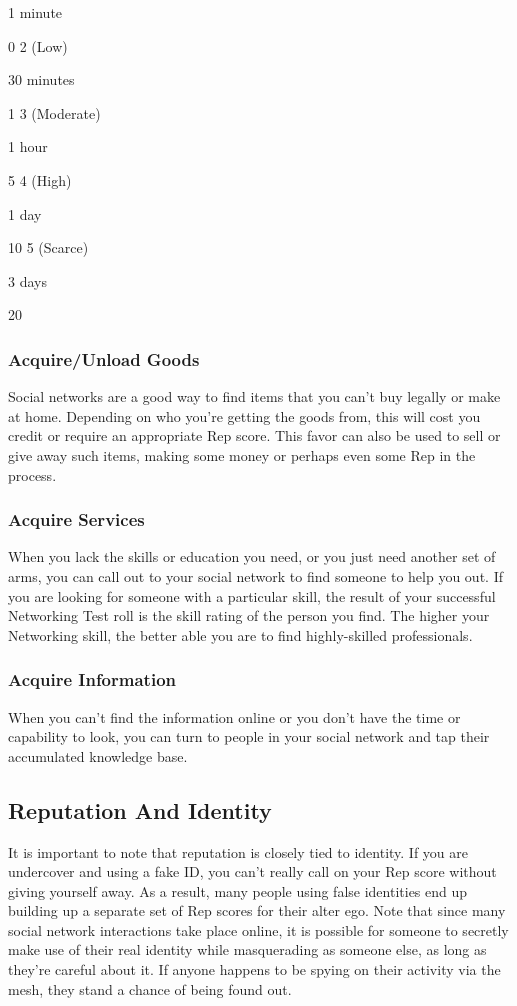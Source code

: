 1 minute

0
2 (Low)

30 minutes

1
3 (Moderate)

1 hour

5
4 (High)

1 day

10
5 (Scarce)

3 days

20

\subsubsection{Acquire/Unload Goods}

Social networks are a good way to find items that 
you can't buy legally or make at home. Depending 
on who you're getting the goods from, this will cost 
you credit or require an appropriate Rep score. This 
favor can also be used to sell or give away such items, 
making some money or perhaps even some Rep in 
the process.

\subsubsection{Acquire Services}

When you lack the skills or education you need, or 
you just need another set of arms, you can call out 
to your social network to find someone to help you 
out. If you are looking for someone with a particular 
skill, the result of your successful Networking Test roll 
is the skill rating of the person you find. The higher 
your Networking skill, the better able you are to find 
highly-skilled professionals.

\subsubsection{Acquire Information}

When you can't find the information online or you 
don't have the time or capability to look, you can 
turn to people in your social network and tap their 
accumulated knowledge base.

\subsection{Reputation And Identity}

It is important to note that reputation is closely tied 
to identity. If you are undercover and using a fake ID, 
you can't really call on your Rep score without giving 
yourself away. As a result, many people using false 
identities end up building up a separate set of Rep 
scores for their alter ego.
Note that since many social network interactions 
take place online, it is possible for someone to secretly 
make use of their real identity while masquerading 
as someone else, as long as they're careful about it. If 
anyone happens to be spying on their activity via the 
mesh, they stand a chance of being found out.

